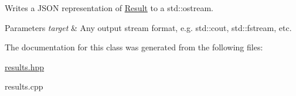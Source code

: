 Writes a J\+S\+ON representation of \hyperlink{class_result}{Result} to a std\+::ostream. 


\begin{DoxyParams}{Parameters}
{\em target} & Any output stream format, e.\+g. std\+::cout, std\+::fstream, etc. \\
\hline
\end{DoxyParams}


The documentation for this class was generated from the following files\+:\begin{DoxyCompactItemize}
\item 
\hyperlink{results_8hpp}{results.\+hpp}\item 
results.\+cpp\end{DoxyCompactItemize}
